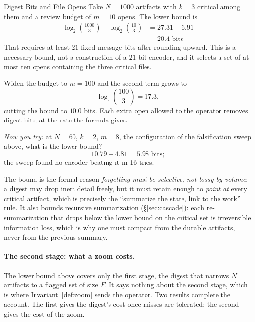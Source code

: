 \documentclass[11pt,a4paper]{article}
\theoremstyle{definition}
\theoremstyle{plain}
\begin{document}
\begin{pdexample}{Digest Bits and File Opens}
\setlength{\parskip}{4pt plus 1pt}
\label{ex:digest-review-budget}
Take $N=1000$ artifacts with $k=3$ critical among
them and a review budget of $m=10$ opens. The lower bound is
\[
\begin{aligned}
\log_2\binom{1000}{3}-\log_2\binom{10}{3}
&= 27.31 - 6.91\\
&= 20.4 \text{ bits}
\end{aligned}
\]
That requires at least $21$ fixed message bits after rounding upward. This
is a necessary bound, not a construction of a $21$-bit encoder, and it selects
a set of at most ten opens containing the three critical files.

Widen the budget to $m=100$ and the second term
grows to
\[
\log_2\binom{100}{3}=17.3,
\]
cutting the bound to $10.0$ bits. Each extra open allowed to the operator
removes digest bits, at the rate the formula gives.

\emph{Now you try:} at $N=60$, $k=2$, $m=8$, the configuration of the
falsification sweep above, what is the lower bound?
\[
10.79-4.81=5.98 \text{ bits};
\]
the sweep found no encoder beating it in 16 tries.
\end{pdexample}

The bound is the formal reason \emph{forgetting must be selective, not lossy-by-volume}:
a digest may drop inert detail freely, but it must retain enough to \emph{point at}
every critical artifact, which is precisely the ``summarize the state, link to
the work'' rule. It also bounds recursive summarization (\S\ref{sec:cascade}): each
re-summarization that drops below the lower bound on the critical set is irreversible
information loss, which is why one must compact from the durable artifacts, never from
the previous summary.

\paragraph{The second stage: what a zoom costs.} The lower bound above covers
only the first stage, the digest that narrows $N$ artifacts to a flagged set of size
$F$. It says nothing about the second stage, which is where Invariant~\ref{def:zoom}
sends the operator. Two results complete the account. The first gives the digest's
cost once misses are tolerated; the second gives the cost of the zoom.
\end{document}
